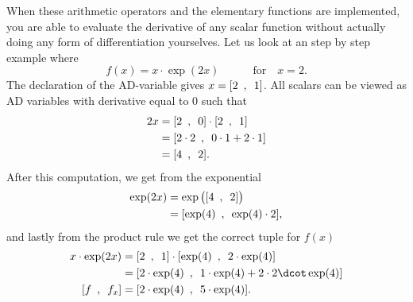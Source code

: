 When these arithmetic operators and the elementary functions are implemented, you are able to evaluate the derivative of any scalar function without actually doing any form of differentiation yourselves. Let us look at an step by step example where 
\begin{equation}
    \label{eq:forwardADExample}
    f(x) = x\cdot\exp(2x) \hspace{3em} \text{for}\hspace{1em} x = 2.
\end{equation}
The declaration of the AD-variable gives $x = [2 \hspace{0.5em} , \hspace{0.5em}  1]$. All scalars can be viewed as AD variables with derivative equal to 0 such that
\begin{align*}
    2x &= [2 \hspace{0.5em} , \hspace{0.5em}  0]\cdot [2 \hspace{0.5em} , \hspace{0.5em} 1] \\
    &=[2\cdot2 \hspace{0.5em} , \hspace{0.5em}  0\cdot1 + 2\cdot 1]\\
    &=[4 \hspace{0.5em} , \hspace{0.5em} 2].
\end{align*}
After this computation, we get from the exponential
\begin{align*}
    \exp(2x) &= \exp\big([4 \hspace{0.5em} , \hspace{0.5em} 2]\big)\\
    &= [\exp(4) \hspace{0.5em} , \hspace{0.5em} \exp(4)\cdot 2],
\end{align*}
and lastly from the product rule we get the correct tuple for $f(x)$
\begin{align*}
    x\cdot \exp(2x) &= [2 \hspace{0.5em} , \hspace{0.5em}  1]\cdot [\exp(4)\hspace{0.5em}, \hspace{0.5em} 2\cdot\exp(4)]\\
    &=[2\cdot\exp(4) \hspace{0.5em} , \hspace{0.5em}  1\cdot \exp(4) + 2\cdot 2\dcot\exp(4)]\\
    [f\hspace{0.5em},\hspace{0.5em} f_x] &=[2\cdot\exp(4) \hspace{0.5em} , \hspace{0.5em} 5\cdot\exp(4)].
\end{align*}
